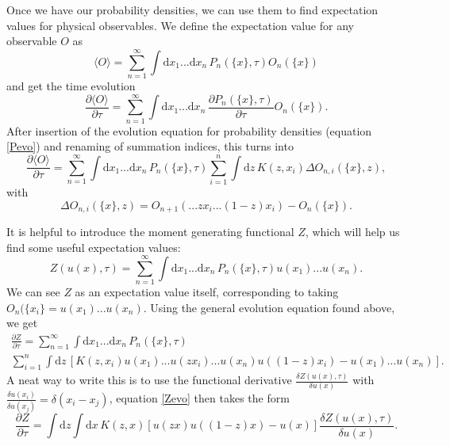 \documentclass[a4paper,12pt]{article}
\newcommand{\party}[2]{\frac{\partial{#1}}{\partial{#2}}}
\numberwithin{equation}{section}
\begin{document}
Once we have our probability densities, we can use them to find expectation values for physical observables. We define the expectation value for any observable $O$ as
\begin{equation}
\langle O \rangle = \sum_{n=1}^\infty \int \mathrm{d}x_1...\mathrm{d}x_n \, P_n(\{x\},\tau) O_n(\{x\})
\end{equation}
and get the time evolution 
\begin{equation}
\party{\langle O \rangle}{\tau}=\sum_{n=1}^\infty \int \mathrm{d}x_1...\mathrm{d}x_n \, \party{P_n(\{x\},\tau)}{\tau} O_n(\{x\}).
\end{equation}
%
After insertion of the evolution equation for probability densities (equation \eqref{Pevo}) and renaming of summation indices, this turns into
%
\begin{equation}
\party{\langle O \rangle}{\tau}=\sum_{n=1}^\infty \int \mathrm{d}x_1...\mathrm{d}x_n\, P_n(\{x\},\tau) \sum_{i=1}^n \int \mathrm{d}z\, K(z,x_i) \Delta O_{n,i}(\{x\},z),
\end{equation}
with
\begin{equation}
\Delta O_{n,i}(\{x\},z)=O_{n+1}(...zx_i...(1-z)x_i)-O_n(\{x\}).
\end{equation}


It is helpful to introduce the moment generating functional $Z$, which will help us find some useful expectation values:
\begin{equation}
Z(u(x),\tau)=\sum_{n=1}^\infty \int \mathrm{d}x_1...\mathrm{d}x_n\, P_n(\{x\},\tau) u(x_1)...u(x_n).
\end{equation}
We can see $Z$ as an expectation value itself, corresponding to taking $O_n(\{x_i\}=u(x_1)...u(x_n)$. Using the general evolution equation found above, we get
\begin{multline}\label{Zevo}
\party{Z}{\tau}=\sum_{n=1}^\infty \int \mathrm{d}x_1...\mathrm{d}x_n\, P_n(\{x\},\tau)\\
 \sum_{i=1}^n \int \mathrm{d}z\, [ K(z,x_i)
u(x_1)...u(zx_i)...u(x_n)u((1-z)x_i) 
- u(x_1)...u(x_n) ].
\end{multline}
A neat way to write this is to use the functional derivative $\frac{\delta Z(u(x),\tau)}{\delta u(x)}$ with $\frac{\delta u(x_i)}{\delta u(x_j)}=\delta(x_i-x_j)$, equation \eqref{Zevo} then takes the form
\begin{equation}
\party{Z}{\tau}=\int \mathrm{d}z \int \mathrm{d}x \, K(z,x) [u(zx)u((1-z)x) - u(x)]\frac{\delta Z(u(x),\tau)}{\delta u(x)}.
\end{equation}
\end{document}
